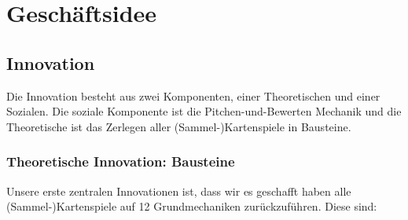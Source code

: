 \documentclass[fontsize=12]{scrartcl}
\begin{document}
	
	
	
	\section{Geschäftsidee}
	
	\subsection{Innovation}
	
	
	Die Innovation besteht aus zwei Komponenten, einer Theoretischen und einer Sozialen. Die soziale Komponente ist die Pitchen-und-Bewerten Mechanik und die Theoretische ist das Zerlegen aller (Sammel-)Kartenspiele in Bausteine.
	
	
	\subsubsection{Theoretische Innovation: Bausteine}
	
	Unsere erste zentralen Innovationen ist, dass wir es geschafft haben alle (Sammel-)Kartenspiele auf 12 Grundmechaniken zurückzuführen. Diese sind:
	
\end{document}
